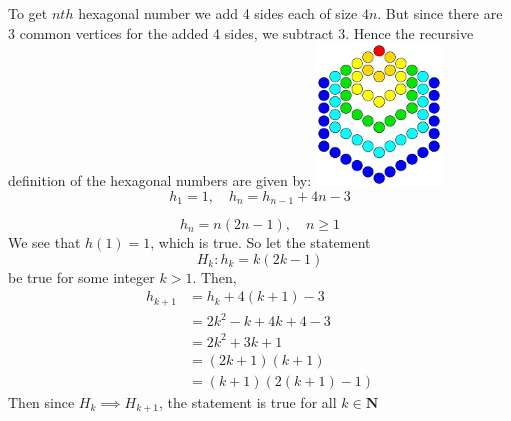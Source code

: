 \begin{questions}
    \begin{solution}
        To get $nth$ hexagonal number we add 4 sides each of size 
        $4n$. But since there are 3 common vertices for the added
        4 sides, we subtract 3.
        Hence the recursive definition of the hexagonal numbers 
        are given by:
        \includegraphics[width=0.25\textwidth]{images/hex.png}
        $$h_1=1, \quad h_n=h_{n-1}+4n-3$$
    \end{solution}
    \begin{solution}
        $$h_n=n(2n-1),\quad n\ge 1$$
        We see that $h(1)=1$, which is true. So let the statement
        $$H_k: h_k=k(2k-1)$$ be true for some integer $k>1$. Then,
        \begin{align*}
            h_{k+1}&=h_k+4(k+1)-3\\
            &=2k^2-k+4k+4-3\\
            &=2k^2+3k+1\\
            &=(2k+1)(k+1)\\
            &=\left(k+1\right)\left(2(k+1)-1\right)
        \end{align*}
        Then since $H_k\implies H_{k+1}$, the statement is true for
        all $k\in\mathbf{N}$
    \end{solution}
\end{questions}